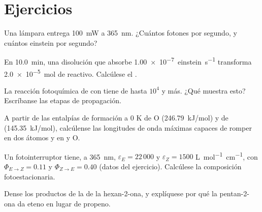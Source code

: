 \section{Ejercicios}

\begin{exercise}[$\star$]\label{exo:b3:photochemistry:1}
Una lámpara entrega \qty{100}{mW} a \qty{365}{nm}. ¿Cuántos fotones por segundo, y cuántos
einstein por segundo?
\end{exercise}

\begin{exercise}[$\star$]\label{exo:b3:photochemistry:2}
En \qty{10.0}{min}, una disolución que absorbe \qty{1.00e-7}{einstein.s^{-1}} transforma
\qty{2.0e-5}{mol} de reactivo. Calcúlese el .
\end{exercise}

\begin{exercise}[$\star$]\label{exo:b3:photochemistry:3}
La reacción fotoquímica de  con  tiene  de hasta $10^4$ y
más. ¿Qué muestra esto? Escríbanse las etapas de propagación.
\end{exercise}

\begin{exercise}[$\star$]\label{exo:b3:photochemistry:4}
A partir de las entalpías de formación a 0 K de O (\qty{246.79}{kJ/mol}) y de 
(\qty{145.35}{kJ/mol}), calcúlense las longitudes de onda máximas capaces de romper  en dos
átomos y  en  y O.
\end{exercise}

\begin{exercise}[$\star\star$]\label{exo:b3:photochemistry:5}
Un fotointerruptor tiene, a \qty{365}{nm}, $\varepsilon_E = 22\,000$ y $\varepsilon_Z = 1500$ \unit{L.mol^{-1}.cm^{-1}}, con
$\Phi_{E\to Z} = 0.11$ y $\Phi_{Z\to E} = 0.40$ (datos del ejercicio). Calcúlese la composición
fotoestacionaria.
\end{exercise}

\begin{exercise}[$\star\star$]\label{exo:b3:photochemistry:6}
Dense los productos de la  de la hexan-2-ona, y explíquese
por qué la pentan-2-ona da eteno en lugar de propeno.
\end{exercise}

